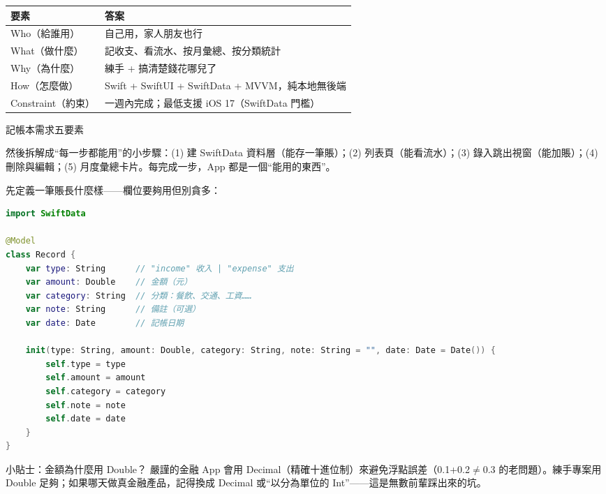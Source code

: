 


\begin{center}
\begin{tabularx}{\linewidth}{|X|X|}
\hline
\textbf{要素} & \textbf{答案} \tabularnewline
\hline
Who（給誰用） & 自己用，家人朋友也行 \tabularnewline
What（做什麼） & 記收支、看流水、按月彙總、按分類統計 \tabularnewline
Why（為什麼） & 練手 + 搞清楚錢花哪兒了 \tabularnewline
How（怎麼做） & Swift + SwiftUI + SwiftData + MVVM，純本地無後端 \tabularnewline
Constraint（約束） & 一週內完成；最低支援 iOS 17（SwiftData 門檻） \tabularnewline
\hline
\end{tabularx}
\end{center}

\begin{center}\small\color{gray}記帳本需求五要素\end{center}

然後拆解成“每一步都能用”的小步驟：(1) 建 SwiftData 資料層（能存一筆賬）；(2) 列表頁（能看流水）；(3) 錄入跳出視窗（能加賬）；(4) 刪除與編輯；(5) 月度彙總卡片。每完成一步，App 都是一個“能用的東西”。


先定義一筆賬長什麼樣——欄位要夠用但別貪多：

\begin{lstlisting}[language=Swift]
import SwiftData

@Model
class Record {
    var type: String      // "income" 收入 | "expense" 支出
    var amount: Double    // 金額（元）
    var category: String  // 分類：餐飲、交通、工資……
    var note: String      // 備註（可選）
    var date: Date        // 記帳日期

    init(type: String, amount: Double, category: String, note: String = "", date: Date = Date()) {
        self.type = type
        self.amount = amount
        self.category = category
        self.note = note
        self.date = date
    }
}
\end{lstlisting}

\begin{tcbinfo}{小貼士：金額為什麼用 Double？}
嚴謹的金融 App 會用 Decimal（精確十進位制）來避免浮點誤差（0.1+0.2$\neq$0.3 的老問題）。練手專案用 Double 足夠；如果哪天做真金融產品，記得換成 Decimal 或“以分為單位的 Int”——這是無數前輩踩出來的坑。

\end{tcbinfo}

